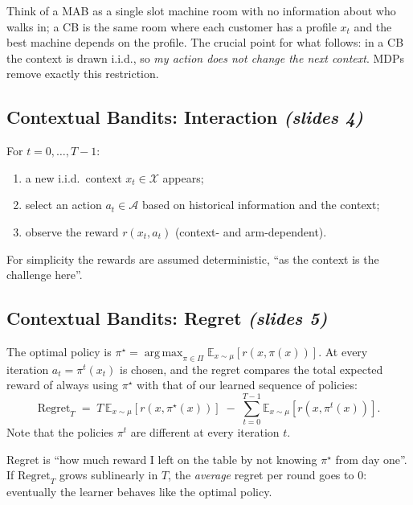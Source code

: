 \documentclass[11pt,a4paper]{article}
\newcommand{\E}{\mathbb{E}}
\newcommand{\cA}{\mathcal{A}}
\DeclareMathOperator*{\argmax}{arg\,max}
\newcommand{\slr}[1]{\texorpdfstring{\emph{(slides #1)}}{(slides #1)}}
\theoremstyle{plain}
\theoremstyle{definition}
\theoremstyle{remark}
\begin{document}
\begin{intuition}
Think of a MAB as a single slot machine room with no information about who walks in; a CB is the same room where each customer has a profile $x_t$ and the best machine depends on the profile. The crucial point for what follows: in a CB the context is drawn i.i.d., so \emph{my action does not change the next context}. MDPs remove exactly this restriction.
\end{intuition}

\subsection{Contextual Bandits: Interaction \slr{4}}
For $t=0,\dots,T-1$:
\begin{enumerate}[nosep]
  \item a new i.i.d.\ context $x_t\in\mathcal X$ appears;
  \item select an action $a_t\in\cA$ based on historical information and the context;
  \item observe the reward $r(x_t,a_t)$ (context- and arm-dependent).
\end{enumerate}
For simplicity the rewards are assumed deterministic, ``as the context is the challenge here''.

\subsection{Contextual Bandits: Regret \slr{5}}
The optimal policy is $\pi^\star=\argmax_{\pi\in\Pi}\E_{x\sim\mu}[r(x,\pi(x))]$. At every iteration $a_t=\pi^t(x_t)$ is chosen, and the regret compares the total expected reward of always using $\pi^\star$ with that of our learned sequence of policies:
\[
  \mathrm{Regret}_T \;=\; T\,\E_{x\sim\mu}\!\left[r(x,\pi^\star(x))\right]\;-\;\sum_{t=0}^{T-1}\E_{x\sim\mu}\!\left[r(x,\pi^t(x))\right].
\]
Note that the policies $\pi^t$ are different at every iteration $t$.

\begin{intuition}
Regret is ``how much reward I left on the table by not knowing $\pi^\star$ from day one''. If $\mathrm{Regret}_T$ grows sublinearly in $T$, the \emph{average} regret per round goes to $0$: eventually the learner behaves like the optimal policy.
\end{intuition}
\end{document}
